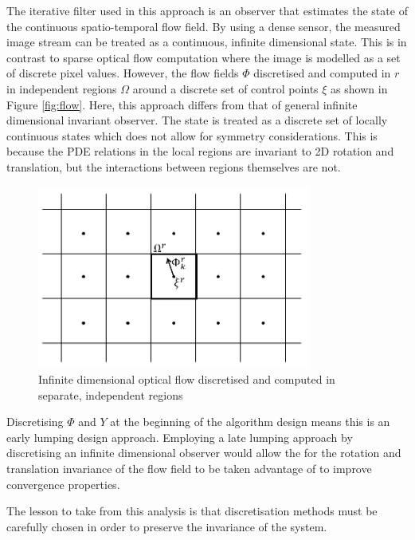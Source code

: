 The iterative filter used in this approach is an observer that estimates the state of the continuous spatio-temporal flow field. By using a dense sensor, the measured image stream can be treated as a continuous, infinite dimensional state. This is in contrast to sparse optical flow computation where the image is modelled as a set of discrete pixel values. However, the flow fields $\Phi$ discretised and computed in $r$ in independent regions $\Omega$ around a discrete set of control points $\xi$ as shown in Figure \ref{fig:flow}. Here, this approach differs from that of general infinite dimensional invariant observer. The state is treated as a discrete set of locally continuous states which does not allow for symmetry considerations. This is because the PDE relations in the local regions are invariant to 2D rotation and translation, but the interactions between regions themselves are not. 

\begin{figure}
\centering
  \includegraphics[width=0.8\textwidth,trim = 0mm 0mm 0mm 0mm,clip]{./Figures/flow_regions.jpg}
  \caption{Infinite dimensional optical flow discretised and computed in separate, independent regions} \label{fig:flow_regions}
\end{figure} \label{fig:flow}

Discretising $\Phi$ and $Y$ at the beginning of the algorithm design means this is an early lumping design approach. Employing a late lumping approach by discretising an infinite dimensional observer would allow the for the rotation and translation invariance of the flow field to be taken advantage of to improve convergence properties.

The lesson to take from this analysis is that discretisation methods must be carefully chosen in order to preserve the invariance of the system.



